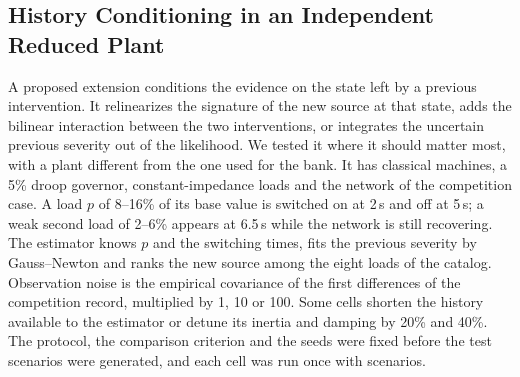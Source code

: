 \subsection{History Conditioning in an Independent Reduced Plant}
\label{sec:history-conditioning}
A proposed extension conditions the evidence on the state left by a previous intervention. It relinearizes the signature of the new source at that state, adds the bilinear interaction between the two interventions, or integrates the uncertain previous severity out of the likelihood. We tested it where it should matter most, with a plant different from the one used for the bank. It has classical machines, a 5\% droop governor, constant-impedance loads and the network of the competition case. A load $p$ of 8--16\% of its base value is switched on at 2\,s and off at 5\,s; a weak second load of 2--6\% appears at 6.5\,s while the network is still recovering. The estimator knows $p$ and the switching times, fits the previous severity by Gauss--Newton and ranks the new source among the eight loads of the catalog. Observation noise is the empirical covariance of the first differences of the competition record, multiplied by 1, 10 or 100. Some cells shorten the history available to the estimator or detune its inertia and damping by 20\% and 40\%. The protocol, the comparison criterion and the seeds were fixed before the test scenarios were generated, and each cell was run once with \HHScenarios{} scenarios.


